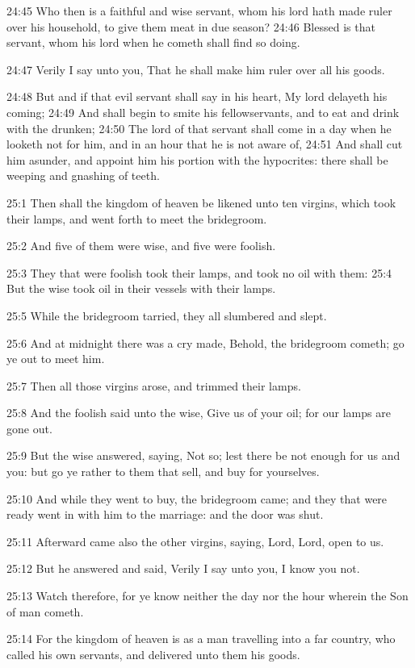 24:45 Who then is a faithful and wise servant, whom his lord hath made
ruler over his household, to give them meat in due season?  24:46
Blessed is that servant, whom his lord when he cometh shall find so
doing.

24:47 Verily I say unto you, That he shall make him ruler over all his
goods.

24:48 But and if that evil servant shall say in his heart, My lord
delayeth his coming; 24:49 And shall begin to smite his
fellowservants, and to eat and drink with the drunken; 24:50 The lord
of that servant shall come in a day when he looketh not for him, and
in an hour that he is not aware of, 24:51 And shall cut him asunder,
and appoint him his portion with the hypocrites: there shall be
weeping and gnashing of teeth.

25:1 Then shall the kingdom of heaven be likened unto ten virgins,
which took their lamps, and went forth to meet the bridegroom.

25:2 And five of them were wise, and five were foolish.

25:3 They that were foolish took their lamps, and took no oil with
them: 25:4 But the wise took oil in their vessels with their lamps.

25:5 While the bridegroom tarried, they all slumbered and slept.

25:6 And at midnight there was a cry made, Behold, the bridegroom
cometh; go ye out to meet him.

25:7 Then all those virgins arose, and trimmed their lamps.

25:8 And the foolish said unto the wise, Give us of your oil; for our
lamps are gone out.

25:9 But the wise answered, saying, Not so; lest there be not enough
for us and you: but go ye rather to them that sell, and buy for
yourselves.

25:10 And while they went to buy, the bridegroom came; and they that
were ready went in with him to the marriage: and the door was shut.

25:11 Afterward came also the other virgins, saying, Lord, Lord, open
to us.

25:12 But he answered and said, Verily I say unto you, I know you not.

25:13 Watch therefore, for ye know neither the day nor the hour
wherein the Son of man cometh.

25:14 For the kingdom of heaven is as a man travelling into a far
country, who called his own servants, and delivered unto them his
goods.

